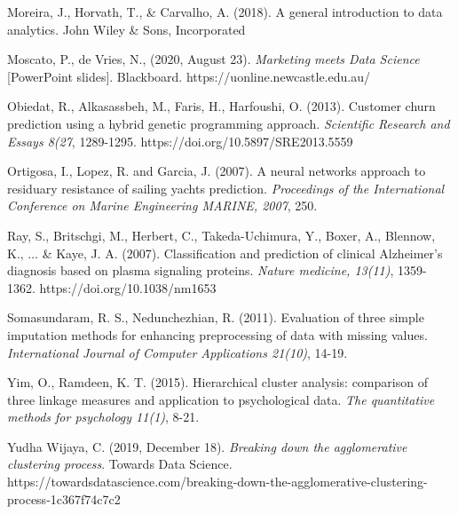 \documentclass[11pt, a4paper]{article}
\begin{document}
\begin{thebibliography}{18}
Moreira, J., Horvath, T., \& Carvalho, A. (2018). A general introduction to data analytics. John Wiley \& Sons, Incorporated

Moscato, P., de Vries, N., (2020, August 23). \emph{Marketing meets Data Science} [PowerPoint slides]. Blackboard. https://uonline.newcastle.edu.au/

Obiedat, R., Alkasassbeh, M., Faris, H., Harfoushi, O. (2013). Customer churn prediction using a hybrid genetic programming approach. \emph{Scientific Research and Essays 8(27}, 1289-1295. https://doi.org/10.5897/SRE2013.5559

Ortigosa, I., Lopez, R. and Garcia, J. (2007). A neural networks approach to residuary resistance of sailing
yachts prediction. \emph{Proceedings of the International Conference on Marine Engineering MARINE, 2007}, 250.

Ray, S., Britschgi, M., Herbert, C., Takeda-Uchimura, Y., Boxer, A., Blennow, K., ... \& Kaye, J. A. (2007). Classification and prediction of clinical Alzheimer's diagnosis based on plasma signaling proteins. \emph{Nature medicine, 13(11)}, 1359-1362. https://doi.org/10.1038/nm1653

Somasundaram, R. S., Nedunchezhian, R. (2011). Evaluation of three simple imputation methods for enhancing preprocessing of data with missing values. \emph{International Journal of Computer Applications 21(10)}, 14-19.

Yim, O., Ramdeen, K. T. (2015). Hierarchical cluster analysis: comparison of three linkage measures and application to psychological data. \emph{The quantitative methods for psychology 11(1)}, 8-21.

Yudha Wijaya, C. (2019, December 18). \emph{Breaking down the agglomerative clustering process}. Towards Data Science. https://towardsdatascience.com/breaking-down-the-agglomerative-clustering-process-1c367f74c7c2
\end{thebibliography}
\end{document}
